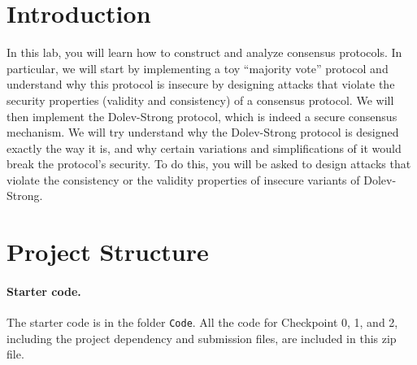 \pagebreak

\section{Introduction}
\label{sec:intro}
In this lab, you will learn how to construct and analyze consensus protocols. In particular, we will start by implementing a toy ``majority vote'' protocol and understand why this protocol is insecure by designing attacks that violate the security properties (validity and consistency) of a consensus protocol. We will then implement the Dolev-Strong protocol, which is indeed a secure consensus mechanism. We will try understand why the Dolev-Strong protocol is designed exactly the way it is, and why certain variations and simplifications of it would break the protocol's security. To do this, you will be asked to design attacks that violate the consistency or the validity properties of insecure variants of Dolev-Strong.

%
\section{Project Structure}

\paragraph{\large Starter code.}
The starter code is in the folder {\tt Code}. All the code for Checkpoint 0, 1, and 2, including the project dependency and submission files, are included in this zip file.




